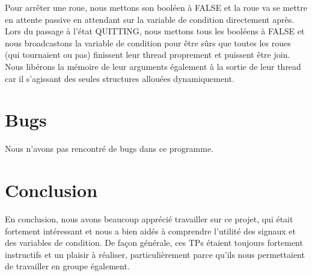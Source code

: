 \documentclass[a4paper]{article}
\begin{document}
Pour arrêter une roue, nous mettons son booléen à FALSE et la roue va se mettre en attente passive en attendant sur la variable de condition directement après. \\

Lors du passage à l'état QUITTING, nous mettons tous les booléens à FALSE et nous broadcastons la variable de condition pour être sûrs que toutes les roues (qui tournaient ou pas) finissent leur thread proprement et puissent être join. Nous libérons la mémoire de leur arguments également à la sortie de leur thread car il s'agissant des seules structures allouées dynamiquement.
\section{Bugs}
Nous n'avons pas rencontré de bugs dans ce programme.
\section{Conclusion}
En conclusion, nous avons beaucoup apprécié travailler sur ce projet, qui était fortement intéressant et nous a bien aidés à comprendre l'utilité des signaux et des variables de condition. De façon générale, ces TPs étaient toujours fortement instructifs et un plaisir à réaliser, particulièrement parce qu'ils nous permettaient de travailler en groupe également.

\end{document}
